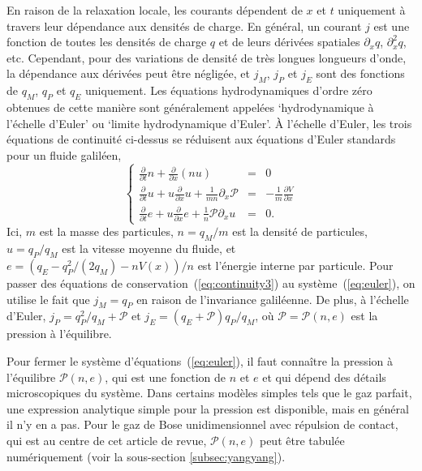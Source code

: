 En raison de la relaxation locale, les courants dépendent de $x$ et $t$ uniquement à travers leur dépendance aux densités de charge. En général, un courant $j$ est une fonction de toutes les densités de charge $q$ et de leurs dérivées spatiales $\partial_x q$, $\partial_x^2 q$, etc. Cependant, pour des variations de densité de très longues longueurs d'onde, la dépendance aux dérivées peut être négligée, et 
$j_M$, $j_P$ et $j_E$ sont des fonctions de $q_M$, $q_P$ et $q_E$ uniquement. Les équations hydrodynamiques d'ordre zéro obtenues de cette manière sont généralement appelées `hydrodynamique à l'échelle d'Euler' ou `limite hydrodynamique d'Euler'. À l'échelle d'Euler, les trois équations de continuité ci-dessus se réduisent aux équations d'Euler standards pour un fluide galiléen,
\begin{equation}
	\label{eq:euler}
	\left\{  \begin{array}{ccc}
		\frac{\partial}{\partial t} n + \frac{\partial}{\partial x}  (nu) &=& 0 \\ 
		\frac{\partial}{\partial t} u + u \frac{\partial}{\partial x} u + \frac{1}{m n} \partial_x \mathcal{P} &=& - \frac{1}{m} \frac{\partial V}{\partial x}   \\ 
		\frac{\partial}{\partial t}  e + u \frac{\partial}{\partial x}  e + \frac{1}{n} \mathcal{P} \partial_x u  &=& 0  .
	\end{array} \right.
\end{equation}
Ici, $m$ est la masse des particules, $n = q_M/m$ est la densité de particules, $u = q_P/q_M$ est la vitesse moyenne du fluide, et $e = (q_E - q_P^2/(2 q_M) - n V(x) ) /n$ est l'énergie interne par particule. Pour passer des équations de conservation~(\ref{eq:continuity3}) au système~(\ref{eq:euler}), on utilise le fait que $j_M = q_P$ en raison de l'invariance galiléenne. De plus, à l'échelle d'Euler, $j_P = q_P^2/q_M + \mathcal{P}$ et $j_E =  (q_E + \mathcal{P}) q_P/q_M$, où $\mathcal{P} = \mathcal{P}(n,e)$ est la pression à l'équilibre.

Pour fermer le système d'équations~(\ref{eq:euler}), il faut connaître la pression à l'équilibre $\mathcal{P}(n,e)$, qui est une fonction de $n$ et $e$ et qui dépend des détails microscopiques du système. Dans certains modèles simples tels que le gaz parfait, une expression analytique simple pour la pression est disponible, mais en général il n'y en a pas. Pour le gaz de Bose unidimensionnel avec répulsion de contact, qui est au centre de cet article de revue, $\mathcal{P}(n,e)$ peut être tabulée numériquement (voir la sous-section \ref{subsec:yangyang}).


